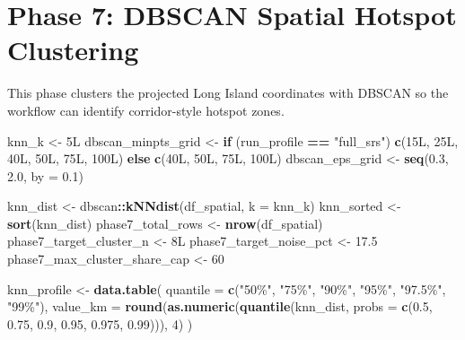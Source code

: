 \documentclass[
]{article}
\newenvironment{Shaded}{\begin{snugshade}}{\end{snugshade}}
\newcommand{\AttributeTok}[1]{\textcolor[rgb]{0.13,0.29,0.53}{#1}}
\newcommand{\ControlFlowTok}[1]{\textcolor[rgb]{0.13,0.29,0.53}{\textbf{#1}}}
\newcommand{\DataTypeTok}[1]{\textcolor[rgb]{0.13,0.29,0.53}{#1}}
\newcommand{\DecValTok}[1]{\textcolor[rgb]{0.00,0.00,0.81}{#1}}
\newcommand{\FloatTok}[1]{\textcolor[rgb]{0.00,0.00,0.81}{#1}}
\newcommand{\FunctionTok}[1]{\textcolor[rgb]{0.13,0.29,0.53}{\textbf{#1}}}
\newcommand{\NormalTok}[1]{#1}
\newcommand{\OtherTok}[1]{\textcolor[rgb]{0.56,0.35,0.01}{#1}}
\newcommand{\SpecialCharTok}[1]{\textcolor[rgb]{0.81,0.36,0.00}{\textbf{#1}}}
\newcommand{\StringTok}[1]{\textcolor[rgb]{0.31,0.60,0.02}{#1}}
\begin{document}
\section{Phase 7: DBSCAN Spatial Hotspot
Clustering}\label{phase-7-dbscan-spatial-hotspot-clustering}

This phase clusters the projected Long Island coordinates with DBSCAN so
the workflow can identify corridor-style hotspot zones.

\begin{Shaded}
\begin{Highlighting}[]
\NormalTok{knn\_k }\OtherTok{\textless{}{-}} \DecValTok{5}\DataTypeTok{L}
\NormalTok{dbscan\_minpts\_grid }\OtherTok{\textless{}{-}} \ControlFlowTok{if}\NormalTok{ (run\_profile }\SpecialCharTok{==} \StringTok{"full\_srs"}\NormalTok{) }\FunctionTok{c}\NormalTok{(}\DecValTok{15}\DataTypeTok{L}\NormalTok{, }\DecValTok{25}\DataTypeTok{L}\NormalTok{, }\DecValTok{40}\DataTypeTok{L}\NormalTok{, }\DecValTok{50}\DataTypeTok{L}\NormalTok{, }\DecValTok{75}\DataTypeTok{L}\NormalTok{, }\DecValTok{100}\DataTypeTok{L}\NormalTok{) }\ControlFlowTok{else} \FunctionTok{c}\NormalTok{(}\DecValTok{40}\DataTypeTok{L}\NormalTok{, }\DecValTok{50}\DataTypeTok{L}\NormalTok{, }\DecValTok{75}\DataTypeTok{L}\NormalTok{, }\DecValTok{100}\DataTypeTok{L}\NormalTok{)}
\NormalTok{dbscan\_eps\_grid }\OtherTok{\textless{}{-}} \FunctionTok{seq}\NormalTok{(}\FloatTok{0.3}\NormalTok{, }\FloatTok{2.0}\NormalTok{, }\AttributeTok{by =} \FloatTok{0.1}\NormalTok{)}

\NormalTok{knn\_dist }\OtherTok{\textless{}{-}}\NormalTok{ dbscan}\SpecialCharTok{::}\FunctionTok{kNNdist}\NormalTok{(df\_spatial, }\AttributeTok{k =}\NormalTok{ knn\_k)}
\NormalTok{knn\_sorted }\OtherTok{\textless{}{-}} \FunctionTok{sort}\NormalTok{(knn\_dist)}
\NormalTok{phase7\_total\_rows }\OtherTok{\textless{}{-}} \FunctionTok{nrow}\NormalTok{(df\_spatial)}
\NormalTok{phase7\_target\_cluster\_n }\OtherTok{\textless{}{-}} \DecValTok{8}\DataTypeTok{L}
\NormalTok{phase7\_target\_noise\_pct }\OtherTok{\textless{}{-}} \FloatTok{17.5}
\NormalTok{phase7\_max\_cluster\_share\_cap }\OtherTok{\textless{}{-}} \DecValTok{60}

\NormalTok{knn\_profile }\OtherTok{\textless{}{-}} \FunctionTok{data.table}\NormalTok{(}
  \AttributeTok{quantile =} \FunctionTok{c}\NormalTok{(}\StringTok{"50\%"}\NormalTok{, }\StringTok{"75\%"}\NormalTok{, }\StringTok{"90\%"}\NormalTok{, }\StringTok{"95\%"}\NormalTok{, }\StringTok{"97.5\%"}\NormalTok{, }\StringTok{"99\%"}\NormalTok{),}
  \AttributeTok{value\_km =} \FunctionTok{round}\NormalTok{(}\FunctionTok{as.numeric}\NormalTok{(}\FunctionTok{quantile}\NormalTok{(knn\_dist, }\AttributeTok{probs =} \FunctionTok{c}\NormalTok{(}\FloatTok{0.5}\NormalTok{, }\FloatTok{0.75}\NormalTok{, }\FloatTok{0.9}\NormalTok{, }\FloatTok{0.95}\NormalTok{, }\FloatTok{0.975}\NormalTok{, }\FloatTok{0.99}\NormalTok{))), }\DecValTok{4}\NormalTok{)}
\NormalTok{)}


\end{Highlighting}
\end{Shaded}
\end{document}
